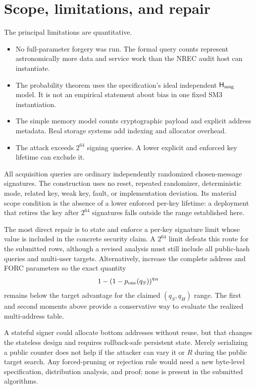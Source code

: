\documentclass[11pt,a4paper]{article}
\newcommand{\Hmsg}{\ensuremath{\mathsf{H}_{\rm msg}}}
\begin{document}
\section{Scope, limitations, and repair}

The principal limitations are quantitative.
\begin{itemize}[leftmargin=*,itemsep=2pt]
  \item No full-parameter forgery was run.  The formal query counts represent
        astronomically more data and service work than the NREC audit host can
        instantiate.
  \item The probability theorem uses the specification's ideal independent
        $\Hmsg$ model.  It is not an empirical statement about bias in one
        fixed SM3 instantiation.
  \item The simple memory model counts cryptographic payload and explicit
        address metadata.  Real storage systems add indexing and allocator
        overhead.
  \item The attack exceeds $2^{64}$ signing queries.  A lower explicit and
        enforced key lifetime can exclude it.
\end{itemize}

All acquisition queries are ordinary independently randomized chosen-message
signatures.  The construction uses no reset, repeated randomizer, deterministic
mode, related key, weak key, fault, or implementation deviation.  Its material
scope condition is the absence of a lower enforced per-key lifetime: a
deployment that retires the key after $2^{64}$ signatures falls outside the
range established here.

The most direct repair is to state and enforce a per-key signature limit whose
value is included in the concrete security claim.  A $2^{64}$ limit defeats
this route for the submitted rows, although a revised analysis must still
include all public-hash queries and multi-user targets.  Alternatively,
increase the complete address and FORC parameters so the exact quantity
\begin{equation}
  1-\left(1-p_{\rm one}(q_S)\right)^{q_H}                  \label{eq:fullsecurity}
\end{equation}
remains below the target advantage for the claimed $(q_S,q_H)$ range.  The
first and second moments above provide a conservative way to evaluate the
realized multi-address table.

A stateful signer could allocate bottom addresses without reuse, but that
changes the stateless design and requires rollback-safe persistent state.
Merely serializing a public counter does not help if the attacker can vary it
or $R$ during the public target search.  Any forced-pruning or rejection rule
would need a new byte-level specification, distribution analysis, and proof;
none is present in the submitted algorithms.
\end{document}
